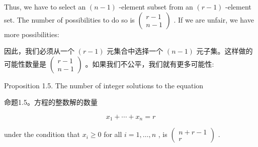\documentclass[10pt]{article}
\begin{document}
\begin{center}
\end{center}

\begin{tcolorbox}\relax

\begin{center}
\end{center}

\end{tcolorbox}

Thus, we have to select an \(\left( {n - 1}\right)\) -element subset from an \(\left( {r - 1}\right)\) -element set. The number of possibilities to do so is \(\left( \begin{matrix} r - 1 \\  n - 1 \end{matrix}\right)\) . If we are unfair, we have more possibilities:

\begin{tcolorbox}\relax
因此，我们必须从一个 \(\left( {r - 1}\right)\) 元集合中选择一个 \(\left( {n - 1}\right)\) 元子集。这样做的可能性数量是 \(\left( \begin{matrix} r - 1 \\  n - 1 \end{matrix}\right)\) 。如果我们不公平，我们就有更多可能性:
\end{tcolorbox}

Proposition 1.5. The number of integer solutions to the equation

\begin{tcolorbox}\relax
命题1.5。方程的整数解的数量
\end{tcolorbox}

\[
{x}_{1} + \cdots  + {x}_{n} = r
\]

under the condition that \({x}_{i} \geq  0\) for all \(i = 1,\ldots ,n\) , is \(\left( \begin{matrix} n + r - 1 \\  r \end{matrix}\right)\) .
\end{document}
